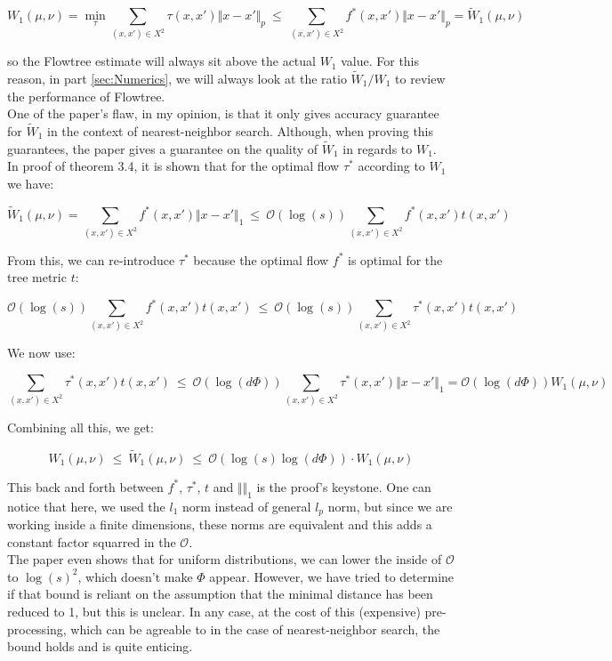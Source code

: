 \documentclass[11pt]{article}
\begin{document}
$$
W_1(\mu, \nu) 
= \min_{\tau} \sum_{\left( x, x' \right) \in X^2 } \tau(x, x') \Vert x - x' \Vert_p
~\leq~ \sum_{\left( x, x' \right) \in X^2 } f^*(x, x') \Vert x - x' \Vert_p
= \widetilde{W}_1(\mu, \nu)
$$

so the Flowtree estimate will always sit above the actual $W_1$ value. For this reason, in part \ref{sec:Numerics}, we will always look at the ratio $\widetilde{W}_1 / W_1$ to review the performance of Flowtree.\\

One of the paper's flaw, in my opinion, is that it only gives accuracy guarantee for $\widetilde{W}_1$ in the context of nearest-neighbor search. Although, when proving this guarantees, the paper gives a guarantee on the quality of $\widetilde{W}_1$ in regards to $W_1$.\\
In proof of \cite{Flowtree} theorem 3.4, it is shown that for the optimal flow $\tau^*$ according to $W_1$ we have:

$$
\widetilde{W}_1(\mu, \nu) 
= \sum_{\left( x, x' \right) \in X^2 } f^*(x, x') \Vert x - x' \Vert_1 
~\leq~ \mathcal{O}(\log(s)) \sum_{\left( x, x' \right) \in X^2 } f^*(x, x') t(x, x')
$$

From this, we can re-introduce $\tau^*$ because the optimal flow $f^*$ is optimal for the tree metric $t$:

$$
\mathcal{O}(\log(s)) \sum_{\left( x, x' \right) \in X^2 } f^*(x, x') t(x, x')
~\leq~ 
\mathcal{O}(\log(s)) \sum_{\left( x, x' \right) \in X^2 } \tau^*(x, x') t(x, x')
$$

We now use:

$$
\sum_{\left( x, x' \right) \in X^2 } \tau^*(x, x') t(x, x') 
~\leq~ 
\mathcal{O}(\log(d\Phi)) \sum_{\left( x, x' \right) \in X^2 } \tau^*(x, x') \Vert x - x' \Vert_1 = \mathcal{O}(\log(d\Phi)) W_1(\mu, \nu)
$$

Combining all this, we get:

$$
W_1(\mu, \nu) 
~\leq~ 
\widetilde{W}_1(\mu, \nu)
~\leq~ 
\mathcal{O}(\log(s) \log(d\Phi)) \cdot W_1(\mu, \nu)
$$

This back and forth between $f^*$, $\tau^*$, $t$ and $\Vert \Vert_1$ is the proof's keystone. One can notice that here, we used the $l_1$ norm instead of general $l_p$ norm, but since we are working inside a finite dimensions, these norms are equivalent and this adds a constant factor squarred in the $\mathcal{O}$. \\

The paper even shows that for uniform distributions, we can lower the inside of $\mathcal{O}$ to $\log \left( s \right)^2$, which doesn't make $\Phi$ appear. However, we have tried to determine if that bound is reliant on the assumption that the minimal distance has been reduced to 1, but this is unclear. In any case, at the cost of this (expensive) pre-processing, which can be agreable to in the case of nearest-neighbor search, the bound holds and is quite enticing.
\end{document}
